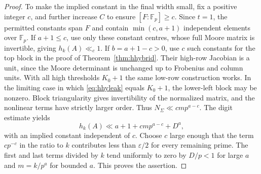 \documentclass[11pt,letterpaper]{article}
\theoremstyle{definition}
\numberwithin{equation}{section}
\begin{document}
\begin{proof}
To make the implied constant in the final width small, fix a
positive integer $c$, and further increase $C$ to ensure
$[F:\mathbb F_p]\ge c$. Since $t=1$, the permitted constants span
$F$ and contain $\min(c,a+1)$ independent elements over $\mathbb F_p$.
If $a+1\le c$, use only these constant centres, whose full Moore
matrix is invertible, giving $h_k(A)\ll_c 1$.
If $b=a+1-c>0$, use $c$ such constants for the top block in the
proof of Theorem~\ref{thm:hhybrid}. Their high-row Jacobian is a
unit, since the Moore determinant is unchanged up to Frobenius
and column units. With all high thresholds $K_0+1$ the same
low-row construction works. In the limiting case in which
\eqref{eq:hhyleak} equals $K_0+1$, the lower-left block may be
nonzero. Block triangularity gives invertibility of the normalized
matrix, and the nonlinear terms have strictly larger order.
Thus $N_\Sigma\ll c m p^{a-c}$. The digit estimate yields
\[
             h_k(A)\ll a+1+c m p^{a-c}+D^a ,
\]
with an implied constant independent of $c$. Choose $c$ large
enough that the term $c p^{-c}$ in the ratio to $k$ contributes
less than $\varepsilon/2$ for every remaining prime. The first and
last terms divided by $k$ tend uniformly to zero by $D/p<1$
for large $a$ and $m=k/p^a$ for bounded $a$. This proves the
assertion.
\end{proof}
\end{document}
